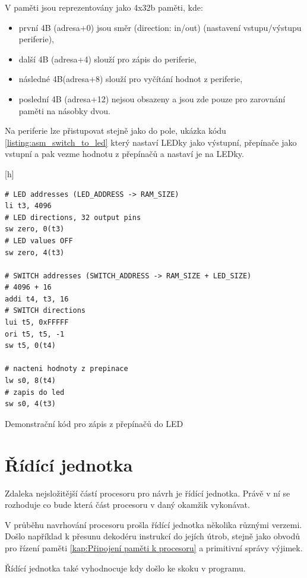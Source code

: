 \documentclass[FM,BP]{tulthesis}
\newenvironment{myquote}{\begin{list}{}{\setlength\leftmargin\parindent}\item[]}{\end{list}}
\newenvironment{listing}{\begin{myquote}\color{\tulcolor}}{\end{myquote}}
\begin{document}
V paměti jsou reprezentovány jako 4x32b paměti, kde:
\begin{itemize}
    \item první 4B (adresa+0) jsou směr (direction: in/out) (nastavení vstupu/výstupu periferie), 
    \item další 4B (adresa+4) slouží pro zápis do periferie,
    \item následné 4B(adresa+8) slouží pro vyčítání hodnot z periferie,
    \item poslední 4B (adresa+12) nejsou obsazeny a jsou zde pouze pro zarovnání paměti na násobky dvou.
\end{itemize}

Na periferie lze přistupovat stejně jako do pole, ukázka kódu \ref{listing:asm_switch_to_led} který nastaví LEDky jako výstupní, přepínače jako vstupní a pak vezme hodnotu z přepínačů a nastaví je na LEDky.

\begin{listing}[h]
    \begin{verbatim}
# LED addresses (LED_ADDRESS -> RAM_SIZE)
li t3, 4096   
# LED directions, 32 output pins
sw zero, 0(t3) 
# LED values OFF
sw zero, 4(t3) 

# SWITCH addresses (SWITCH_ADDRESS -> RAM_SIZE + LED_SIZE)
# 4096 + 16
addi t4, t3, 16
# SWITCH directions
lui t5, 0xFFFFF
ori t5, t5, -1
sw t5, 0(t4)

# nacteni hodnoty z prepinace
lw s0, 8(t4)
# zapis do led
sw s0, 4(t3)
    \end{verbatim}
    \caption{Demonstrační kód pro zápis z přepínačů do LED}
    \label{listing:asm_switch_to_led}
\end{listing}

\section{Řídící jednotka} \label{kap:cu}
Zdaleka nejsložitější částí procesoru pro návrh je řídící jednotka. Právě v ní se rozhoduje co bude která část procesoru v daný okamžik vykonávat. 

V průběhu navrhování procesoru prošla řídící jednotka několika různými verzemi. Došlo například k přesunu dekodéru instrukcí do jejích útrob, stejně jako obvodů pro řízení paměti \ref{kap:Připojení paměti k procesoru} a primitivní správy výjimek. 

Řídící jednotka také vyhodnocuje kdy došlo ke skoku v programu.  
\end{document}
